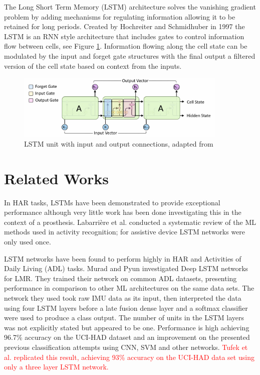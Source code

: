 \documentclass[sensors,article,submit,moreauthors,pdftex]{Definitions/mdpi}
\begin{document}
The Long Short Term Memory (LSTM) architecture solves the vanishing gradient problem by adding mechanisms for regulating information allowing it to be retained for long periods. Created by Hochreiter and Schmidhuber in 1997\cite{Hochreiter1997} the LSTM is an RNN style architecture that includes gates to control information flow between cells, see Figure \ref{fig:lstm_unit}. Information flowing along the cell state can be modulated by the input and forget gate structures with the final output a filtered version of the cell state based on context from the inputs.\cite{Olah2015}

\begin{figure}[!htb]
    \centering
    \includegraphics[width=0.9\textwidth]{Figures/lstm/lstm_internal_operation.jpg}
    \caption{LSTM unit with input and output connections, adapted from\cite{Olah2015}}
    \label{fig:lstm_unit}
\end{figure}

\section{Related Works}
\label{sec:related_work}
In HAR tasks, LSTMs have been demonstrated to provide exceptional performance\cite{Murad2017} although very little work has been done investigating this in the context of a prosthesis. Labarri\`ere et al. conducted a systematic review of the ML methods used in activity recognition; for assistive device LSTM networks were only used once\cite{Labarriere2020}.

LSTM networks have been found to perform highly in HAR and Activities of Daily Living (ADL) tasks. Murad and Pyun investigated Deep LSTM networks for LMR\cite{Murad2017}. They trained their network on common ADL datasets, presenting performance in comparison to other ML architectures on the same data sets. The network they used took raw IMU data as its input, then interpreted the data using four LSTM layers before a late fusion dense layer and a softmax classifier were used to produce a class output. The number of units in the LSTM layers was not explicitly stated but appeared to be one. Performance is high achieving 96.7\% accuracy on the UCI-HAD dataset\cite{Anguita2013} and an improvement on the presented previous classification attempts using CNN, SVM and other networks. \textcolor{red}{Tufek et al. replicated this result, achieving 93\% accuracy on the UCI-HAD data set using only a three layer LSTM network. \cite{Tufek2020}} 
\end{document}

